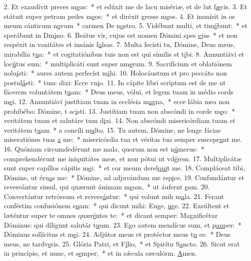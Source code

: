 2. Et exaudívit preces m\uline{e}as:~* et edúxit me de lacu misériæ, et de lut f\uline{æ}cis.
3. Et státuit super petram pedes m\uline{e}os:~* et diréxit gresss m\uline{e}os.
4. Et immísit in os meum cánticum n\uline{o}vum~* carmen De n\uline{o}stro.
5. Vidébunt multi, et tim\uline{é}bunt:~* et sperábunt in Dm\uline{i}no.
6. Beátus vir, cujus est nomen Dómini spes \uline{e}jus~* et non respéxit in vanitátes et insánis f\uline{a}lsas.
7. Multa fecísti tu, Dómine, Deus meus, mirabília t\uline{u}a:~* et cogitatiónibus tuis non est qui símilis st t\uline{i}bi.
8. Annuntiávi et loc\uline{ú}tus sum:~* multiplicáti sunt super nm\uline{e}rum.
9. Sacrifícium et oblatiónem nolu\uline{í}sti:~* aures autem perfecíst m\uline{i}hi.
10. Holocáustum et pro peccáto non postul\uline{á}sti:~* tunc dixi: Ecce vn\uline{i}o.
11. In cápite libri scriptum est de me ut fácerem voluntátem t\uline{u}am:~* Deus meus, vólui, et legem tuam in médio cords m\uline{e}i.
12. Annuntiávi justítiam tuam in ecclésia m\uline{a}gna,~* ecce lábia mea non prohibébo: Dómine, t sc\uline{i}sti.
13. Justítiam tuam non abscóndi in corde m\uline{e}o:~* veritátem tuam et salutáre tum d\uline{i}xi.
14. Non abscóndi misericórdiam tuam et veritátem t\uline{u}am~* a concíli m\uline{u}lto.
15. Tu autem, Dómine, ne longe fácias miseratiónes tuas \uline{a} me:~* misericórdia tua et véritas tua semper suscepr\uline{u}nt me.
16. Quóniam circumdedérunt me mala, quorum non est n\uline{ú}merus:~* comprehendérunt me iniquitátes meæ, et non pótui ut vd\uline{é}rem.
17. Multiplicátæ sunt super capíllos cápitis m\uline{e}i:~* et cor meum derel\uline{qui}t me.
18. Compláceat tibi, Dómine, ut éru\uline{a}s me:~* Dómine, ad adjuvándum me rsp\uline{i}ce.
19. Confundántur et revereántur simul, qui quærunt ánimam m\uline{e}am,~* ut áufernt \uline{e}am.
20. Convertántur retrórsum et revere\uline{á}ntur:~* qui volunt mih m\uline{a}la.
21. Ferant conféstim confusiónem s\uline{u}am:~* qui dicunt mihi: Euge, \uline{u}ge.
22. Exsúltent et læténtur super te omnes quær\uline{é}ntes te:~* et dicant semper: Magnificétur Dóminus: qui díligunt salutár t\uline{u}um.
23. Ego autem mendícus sum, et p\uline{au}per:~* Dóminus sollícitus st m\uline{e}i.
24. Adjútor meus et protéctor meus t\uline{u} es:~* Deus meus, ne tardv\uline{e}ris.
25. Glória Patri, et F\uline{í}lio,~* et Spirítu S\uline{a}ncto.
26. Sicut erat in princípio, et nunc, et s\uline{e}mper,~* et in sǽcula sæculórm. \uline{A}men.

